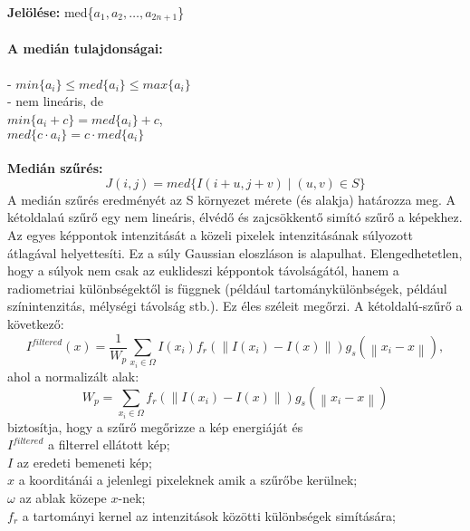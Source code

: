 \\
 \textbf{Jelölése:} med\{$a_1,a_2,\dots,a_{2n+1}$\}\\ \\
 \textbf{A medián tulajdonságai:}\\
 \\
- $min\{a_i\}\leq med\{a_i\}\leq max\{a_i\}$\\
- nem lineáris, de\\
\indent $min\{a_i+c\}=med\{a_i\}+c$,\\
\indent $med\{c\cdot a_i\}=c \cdot med\{a_i\}$\\
\\
\textbf{Medián szűrés:}\\
$$J(i,j)=med\{I(i+u,j+v)\mid (u,v)\in S \}$$ 
A medián szűrés eredményét az S környezet mérete (és alakja) határozza meg.
A kétoldalaú szűrő egy nem lineáris, élvédő és zajcsökkentő simító szűrő a képekhez. Az egyes képpontok intenzitását a közeli pixelek intenzitásának súlyozott átlagával helyettesíti. Ez a súly Gaussian eloszláson is  alapulhat. Elengedhetetlen, hogy a súlyok nem csak az euklideszi képpontok távolságától, hanem a radiometriai különbségektől is függnek (például tartománykülönbségek, például színintenzitás, mélységi távolság stb.). Ez éles széleit megőrzi. A kétoldalú-szűrő a következő:
$$I^{filtered}(x)=\frac{1}{W_p}\sum_{x_i\in\Omega}{I(x_i)f_r(\left \| I(x_i)-I(x) \right \|)g_s(\left \| x_i-x \right \|)},$$
ahol a normalizált alak: 
$$W_p=\sum_{x_i\in\Omega}f_r(\left \| I(x_i)-I(x) \right \|)g_s(\left \| x_i-x \right \|)$$
biztosítja, hogy a szűrő megőrizze a kép energiáját és\\
\indent $I^{filtered}$ a filterrel ellátott kép;\\
\indent$I$ az eredeti bemeneti kép;\\
\indent$x$ a koorditánái a jelenlegi pixeleknek amik a szűrőbe kerülnek;\\
\indent$\omega$ az ablak közepe $x$-nek;\\
\indent$f_r$ a tartományi kernel az intenzitások közötti különbségek simítására;\\
